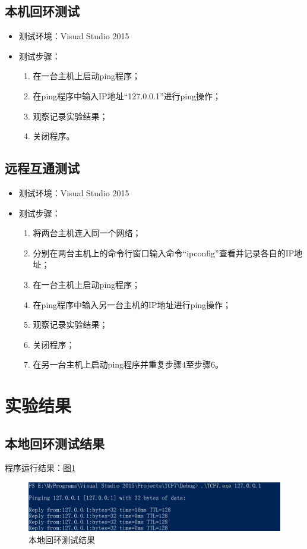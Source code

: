 \documentclass[a4paper]{ctexrep}
\begin{document}
\begin{spacing}{1.5}
\subsection{本机回环测试}
\begin{itemize}
	\item 测试环境：Visual Studio 2015
	\item 测试步骤：
	\begin{enumerate}
		\item 在一台主机上启动ping程序；
		\item 在ping程序中输入IP地址“127.0.0.1”进行ping操作；
		\item 观察记录实验结果；
		\item 关闭程序。
	\end{enumerate}
\end{itemize}

\subsection{远程互通测试}
\begin{itemize}
	\item 测试环境：Visual Studio 2015
	\item 测试步骤：
	\begin{enumerate}
		\item 将两台主机连入同一个网络；
		\item 分别在两台主机上的命令行窗口输入命令“ipconfig”查看并记录各自的IP地址；
		\item 在一台主机上启动ping程序；
		\item 在ping程序中输入另一台主机的IP地址进行ping操作；
		\item 观察记录实验结果；
		\item 关闭程序；
		\item 在另一台主机上启动ping程序并重复步骤4至步骤6。
	\end{enumerate}
\end{itemize}

\newpage
\section{实验结果}
\subsection{本地回环测试结果}
程序运行结果：图\ref{result}
\begin{figure}[htbp]
	\centering
	\includegraphics [width=1\textwidth]{figure//res_local.png}
	\caption{本地回环测试结果}\label{result}
\end{figure}


\end{spacing}
\end{document}
